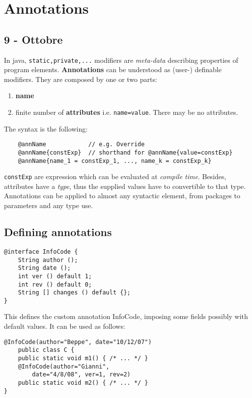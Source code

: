 \chapter{Annotations}
\section*{9 - Ottobre}
In java, \lstinline{static,private,...} modifiers are \textit{meta-data} describing properties of program elements.
\textbf{Annotations} can be understood as (user-) definable modifiers.
They are composed by one or two parts:
\begin{enumerate}
    \item \textbf{name}
    \item finite number of \textbf{attributes} i.e. \lstinline{name=value}.
    There may be no attributes.
\end{enumerate}
The syntax is the following:
\begin{lstlisting}
    @annName            // e.g. Override
    @annName{constExp}  // shorthand for @annName{value=constExp}
    @annName{name_1 = constExp_1, ..., name_k = constExp_k}
\end{lstlisting}
\lstinline{constExp} are expression which can be evaluated at \textit{compile time}.
Besides, attributes have a \textit{type}, thus the supplied values have to
convertible to that type.\\
Annotations can be applied to almost any syntactic element, from packages to parameters and any type use.

\section{Defining annotations}
\begin{lstlisting}
@interface InfoCode {
    String author ();
    String date ();
    int ver () default 1;
    int rev () default 0;
    String [] changes () default {};
}
\end{lstlisting}

This defines the custom annotation InfoCode, imposing some fields possibly with default values.
It can be used as follows:
\begin{lstlisting}
@InfoCode(author="Beppe", date="10/12/07")
    public class C {
    public static void m1() { /* ... */ }
    @InfoCode(author="Gianni",
        date="4/8/08", ver=1, rev=2)
    public static void m2() { /* ... */ }
}
\end{lstlisting}